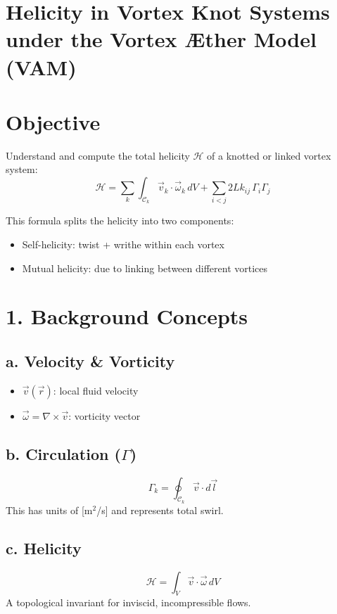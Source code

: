 \documentclass[11pt]{article}
\begin{document}
    \section{Helicity in Vortex Knot Systems under the Vortex Æther Model (VAM)}

    \section*{Objective}
    Understand and compute the total helicity $\mathcal{H}$ of a knotted or linked vortex system:
    \begin{equation}
        \boxed{
            \mathcal{H} = \sum_{k} \int_{\mathcal{C}_k} \vec{v}_k \cdot \vec{\omega}_k \, dV + \sum_{i<j} 2Lk_{ij} \, \Gamma_i \Gamma_j
        }
    \end{equation}

    This formula splits the helicity into two components:
    \begin{itemize}
        \item Self-helicity: twist + writhe within each vortex
        \item Mutual helicity: due to linking between different vortices
    \end{itemize}

    \section*{1. Background Concepts}
    \subsection*{a. Velocity \& Vorticity}
    \begin{itemize}
        \item $\vec{v}(\vec{r})$: local fluid velocity
        \item $\vec{\omega} = \nabla \times \vec{v}$: vorticity vector
    \end{itemize}

    \subsection*{b. Circulation ($\Gamma$)}
    \begin{equation}
        \Gamma_k = \oint_{\mathcal{C}_k} \vec{v} \cdot d\vec{l}
    \end{equation}
    This has units of [m$^2$/s] and represents total swirl.

    \subsection*{c. Helicity}
    \begin{equation}
        \mathcal{H} = \int_V \vec{v} \cdot \vec{\omega} \, dV
    \end{equation}
    A topological invariant for inviscid, incompressible flows.
\end{document}
